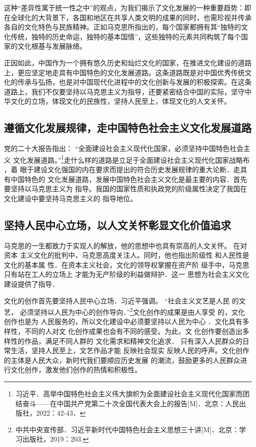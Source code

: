 这种“差异性寓于统一性之中”的观点，为我们揭示了文化发展的一种重要趋势：即在全球化的大背景下，各国和地区在共享人类文明的成果的同时，也需珍视并传承各自的文化特色与民族精神。正如马克思所指出的，每个国家都拥有其“独特的文化传统，独特的历史命运，独特的基本国情”，这些独特的元素共同构筑了每个国家的文化根基与发展脉络。

正因如此，中国作为一个拥有悠久历史和灿烂文化的国家，在推进文化建设的道路上，更应坚定地走具有中国特色的文化发展道路。这条道路既是对中国优秀传统文化的传承与弘扬，也是对中国现代化进程中的文化创新与发展的积极探索。在这条道路上，我们不仅要坚持以马克思主义为指导，还要紧密结合中国的实际，坚守中华文化的立场，体现文化的民族性，坚持人民至上，体现文化的人文关怀。

\subsection{遵循文化发展规律，走中国特色社会主义文化发展道路}
党的二十大报告指出： “全面建设社会主义现代化国家，必须坚持中国特色社会主
义 文化发展道路。”\footnote{习近平．高举中国特色社会主义伟大旗帜\quad 为全面建设社会主义现代化国家而团结奋斗------在中国共产党第二十次全国代表大会上的报告[M]．北京：人民出版社，2022：42-43．
}走什么样的道路是立足于全面建设社会主义现代化国家战略布
，着 眼于建设文化强国的内在要求而提出的符合历史发展规律的重大论断．走具有中国特色的 文化发展道路，发展中国特色社会主义文化是最主要的内容．首先要坚持以马克思主义为 指导。我国的国家性质和执政党的阶级属性决定了我国在文化建设中要坚持马克思主义的 指导地位。

\subsection{坚持人民中心立场，以人文关怀彰显文化价值追求}
马克思的一生都致力于实现人的解放，他的思想中也具有崇高的人文关怀。
在对资本 主义文化的批判中，马克思高度关注人。同时，他也指出阶级性
和人民性是文化的基本属 性．在资本主义社会，文化的领导权掌握在资产阶
级手中，马克思只有站在工人的立场上 才能为无产阶级的利益做辩护．这一
思想为社会主义文化建设提供了指导．

文化的创作首先要坚持人民中心立场．习近平强调。 “社会主义文艺是人民
的文艺， 必须坚持以人民为中心的创作导向．”\footnote{中共中央宣传部．习近平新时代中国特色社会主义思想三十讲[M]．北京：学习出版社，2019：203.
}文化创作的成果是由人享受
的，文化创作也是为 人民服务的，所以文化建设中必须要坚持以人民为中心
．文化具有多样性，不同的人对文 化创作成果也会有不同的感受。为此，文
化创作要创造出多样性的作品，满足不同人群的 文化需求和精神文化追求．
只有深入人民群众的日常生活，坚持人民至上，文艺作品才能 反映社会现实
反映人民的呼声。文化创作的主体是人民大众，新时代我们要顺应历史发展 
的潮流，鼓励更多的人民群众进行文化创作，激发他们创作的热情和积极性。

